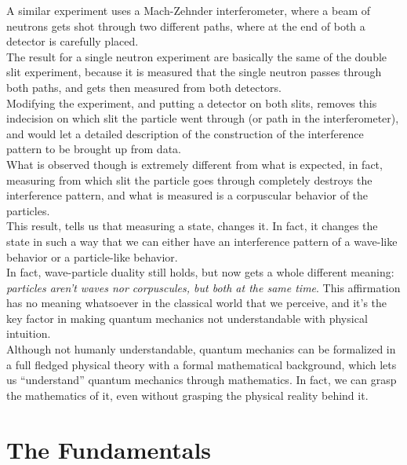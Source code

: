 \documentclass[a4paper, 11pt]{book}
\newcommand{\1}{\opr{\mathds{1}}}
\theoremstyle{plain}
\begin{document}
	A similar experiment uses a Mach-Zehnder interferometer, where a beam of neutrons gets shot through two different paths, where at the end of both a detector is carefully placed.\\
	The result for a single neutron experiment are basically the same of the double slit experiment, because it is measured that the single neutron passes through both paths, and gets then measured from both detectors.\\
	Modifying the experiment, and putting a detector on both slits, removes this indecision on which slit the particle went through (or path in the interferometer), and would let a detailed description of the construction of the interference pattern to be brought up from data.\\
	What is observed though is extremely different from what is expected, in fact, measuring from which slit the particle goes through completely destroys the interference pattern, and what is measured is a corpuscular behavior of the particles.\\
	This result, tells us that measuring a state, changes it. In fact, it changes the state in such a way that we can either have an interference pattern of a wave-like behavior or a particle-like behavior.\\
	In fact, wave-particle duality still holds, but now gets a whole different meaning: \textit{particles aren't waves nor corpuscules, but both at the same time}. This affirmation has no meaning whatsoever in the classical world that we perceive, and it's the key factor in making quantum mechanics not understandable with physical intuition.\\
	Although not humanly understandable, quantum mechanics can be formalized in a full fledged physical theory with a formal mathematical background, which lets us ``understand'' quantum mechanics through mathematics. In fact, we can grasp the mathematics of it, even without grasping the physical reality behind it.
	\chapter{The Fundamentals}
\end{document}
